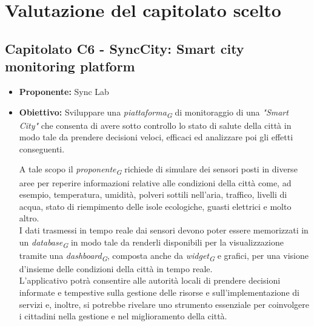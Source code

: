 \documentclass{article}
\begin{document}

\section{Valutazione del capitolato scelto}

\subsection{\textbf{Capitolato C6} - SyncCity: Smart city monitoring platform}
\begin{itemize}
    \item[] \textbf{Proponente:} Sync Lab
    
    \item[] \textbf{Obiettivo:} Sviluppare una \textit{piattaforma}\textsubscript{\textit{G}} di monitoraggio di una \textit{"Smart City"} che consenta di avere sotto controllo lo stato di salute della città in modo tale da prendere decisioni veloci, efficaci ed analizzare poi gli effetti conseguenti.  
    
    A tale scopo il \textit{proponente}\textsubscript{\textit{G}} richiede di simulare dei sensori posti in diverse aree per reperire informazioni relative alle condizioni della città come, ad esempio, temperatura, umidità, polveri sottili nell'aria, traffico, livelli di acqua, stato di riempimento delle isole ecologiche, guasti elettrici e molto altro.\\
    I dati trasmessi in tempo reale dai sensori devono poter essere memorizzati in un \textit{database}\textsubscript{\textit{G}} in modo tale da renderli disponibili per la visualizzazione tramite una \textit{dashboard}\textsubscript{\textit{G}}, composta anche da \textit{widget}\textsubscript{\textit{G}} e grafici, per una visione d'insieme delle condizioni della città in tempo reale.\\
    L'applicativo potrà consentire alle autorità locali di prendere decisioni informate e tempestive sulla gestione delle risorse e sull'implementazione di servizi e, inoltre, si potrebbe rivelare uno strumento essenziale per coinvolgere i cittadini nella gestione e nel miglioramento della città. 
    

\end{itemize}
\end{document}
